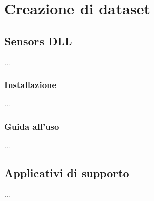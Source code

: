 \section{Creazione di dataset}
\label{sec:create-dataset-howto}

\lipsum[2]

\subsection{Sensors DLL}
...

\subsubsection{Installazione}
...

\subsubsection{Guida all'uso}
...

\subsection{Applicativi di supporto}
...
